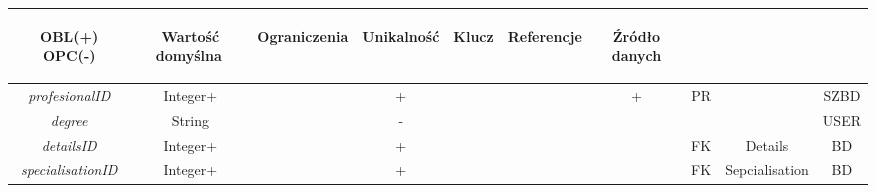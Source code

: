\documentclass[12pt,oneside]{report}
\begin{document}
\begin{enumerate}[start=1,label={\bfseries REL\textbackslash0\arabic*}]
\begin{table}[H]
\begin{tabular}{|c|c|c|c|c|c|c|c|c|c|}
		\begin{sideways}OBL(+) OPC(-)\end{sideways} & 
		\begin{sideways}Wartość domyślna$\ $\end{sideways}& 
		\begin{sideways}Ograniczenia\end{sideways} &
		\begin{sideways}Unikalność \end{sideways}& 
		\begin{sideways}Klucz \end{sideways}& 
		\begin{sideways}Referencje \end{sideways}&
		\begin{sideways}Źródło danych\end{sideways}\\
		\hline
		\textit{profesionalID}&Integer+&&+&&&+&PR&&SZBD\\
		\hline
		\textit{degree}&String&&-&&&&&&USER\\
		\hline
		\textit{detailsID}&Integer+&&+&&&&FK&Details&BD\\
		\hline
		\textit{specialisationID}&Integer+&&+&&&&FK&Sepcialisation&BD\\
		\hline
	\end{tabular}
\end{table}


\end{enumerate}
\end{document}
